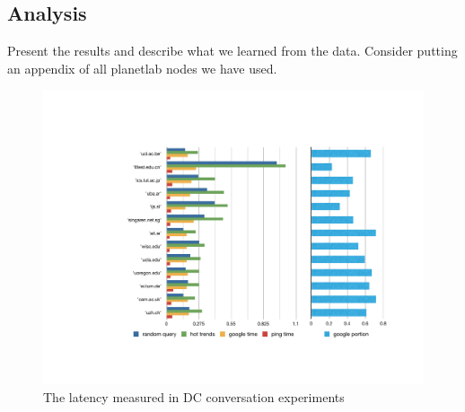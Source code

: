 \subsection{Analysis}
\label{sec:analysis}

Present the results and describe what we learned from the data.
Consider putting an appendix of all planetlab nodes we have used.

\begin{figure}[!htb]
  \centering
  \includegraphics[width=\linewidth]{../figs/data_center.pdf}
  \caption{The latency measured in DC conversation experiments}
  \label{fig:data_center}
\end{figure}




